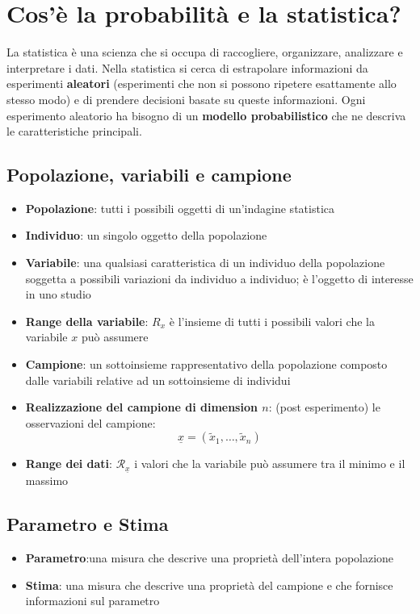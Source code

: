 \documentclass[a4paper]{article}
\theoremstyle{break}
\theoremstyle{break}
\theoremstyle{break}
\theoremstyle{break}
\begin{document}


\tableofcontents
\pagebreak


\section{Cos'è la probabilità e la statistica?}
La statistica è una scienza che si occupa di raccogliere, organizzare, analizzare
e interpretare i dati. Nella statistica si cerca di estrapolare informazioni da
esperimenti \textbf{aleatori} (esperimenti che non si possono ripetere esattamente allo stesso
modo) e di prendere decisioni basate su queste informazioni. Ogni esperimento aleatorio
ha bisogno di un \textbf{modello probabilistico} che ne descriva le caratteristiche principali.

\subsection{Popolazione, variabili e campione}
\begin{itemize}
	\item \textbf{Popolazione}: tutti i possibili oggetti di un'indagine statistica
	\item \textbf{Individuo}: un singolo oggetto della popolazione
	\item \textbf{Variabile}: una qualsiasi caratteristica di un individuo della
	      popolazione soggetta a possibili variazioni da individuo a individuo; è l'oggetto
	      di interesse in uno studio
	\item \textbf{Range della variabile}: \( R_x \) è l'insieme di tutti i possibili
	      valori che la variabile \( x \) può assumere
	\item \textbf{Campione}: un sottoinsieme rappresentativo della popolazione
	      composto dalle variabili relative ad un sottoinsieme di individui
	\item \textbf{Realizzazione del campione di dimension \( n \)}: (post esperimento)
	      le osservazioni del campione:\[
		      \underline{x} = (\tilde{x}_1, \ldots, \tilde{x}_n)
	      \]
	\item \textbf{Range dei dati}: \( \mathcal{R}_{\underline{x}} \) i valori che la
	      variabile può assumere tra il minimo e il massimo
\end{itemize}

\subsection{Parametro e Stima}
\begin{itemize}
	\item \textbf{Parametro}:una misura che descrive una proprietà dell'intera popolazione
	\item \textbf{Stima}: una misura che descrive una proprietà del campione e che
	      fornisce informazioni sul parametro
\end{itemize}
\end{document}

